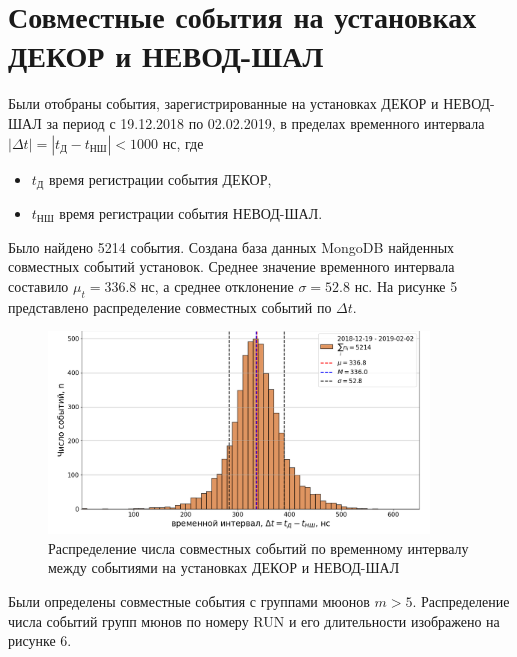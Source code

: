 \chapter*{Совместные события на установках ДЕКОР и НЕВОД-ШАЛ}
\label{ch:intro}
Были отобраны события, зарегистрированные на установках ДЕКОР и НЕВОД-ШАЛ за период с 19.12.2018 по 02.02.2019, в пределах временного интервала \(|\Delta t| = |t_{\text{Д}} - t_{\text{НШ}}|  < 1000\) нс, где 

\begin{itemize}
    \item \(t_{\text{Д}}\) время регистрации события ДЕКОР,
    \item \(t_{\text{НШ}}\) время регистрации события НЕВОД-ШАЛ.
\end{itemize}
Было найдено 5214 события. Создана база данных MongoDB найденных совместных событий установок. Среднее значение временного интервала составило \( \mu_t = 336.8 \) нс, а среднее отклонение \( \sigma = 52.8 \) нс. На рисунке 5 представлено распределение совместных событий по \(\Delta t\).
\begin{figure}[ht]
    \centering
    \includegraphics[width=0.9\textwidth]{images/events_by_delta_time.png}
    \caption{Распределение числа совместных событий по временному интервалу между событиями на установках ДЕКОР и НЕВОД-ШАЛ}
    \label{fig:your_image_label}
\end{figure}

Были определены совместные события с группами мюонов \(m > 5\). Распределение числа событий групп мюнов по номеру RUN и его длительности изображено на рисунке 6.

